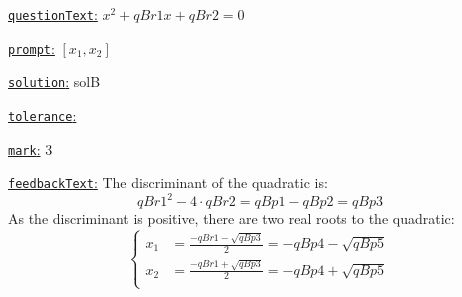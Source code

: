 \documentclass[preview]{standalone}
\newcommand \fieldname[1]{\underline{\texttt{#1}:}}
\begin{document}
\fieldname{questionText}
$x^2 + {qBr1}x + {qBr2} = 0$

\fieldname{prompt}
$[x_1,x_2]$

\fieldname{solution}
solB

\fieldname{tolerance}


\fieldname{mark}
3

\fieldname{feedbackText}
The discriminant of the quadratic is:
\[
{qBr1}^2-4\cdot{qBr2} = {qBp1} - {qBp2} = {qBp3}
\]
As the discriminant is positive, there are two real roots to the quadratic:
\[
\left\{\begin{aligned}
x_1 & = \frac{-{qBr1}-\sqrt{{qBp3}}}{2} = -{qBp4} - \sqrt{{qBp5}}\\
x_2 & = \frac{-{qBr1}+\sqrt{{qBp3}}}{2} = -{qBp4} + \sqrt{{qBp5}}\\
\end{aligned}\right.
\]

\end{document}
